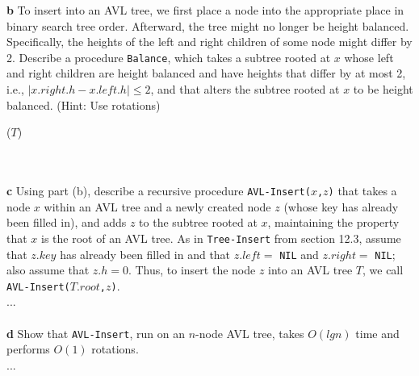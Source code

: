 \documentclass[11pt,english]{article}
\begin{document}
\newpage
\noindent \large{\textbf{b} \mdseries To insert into an AVL tree, we first
place a node into the appropriate place in binary search tree order.
Afterward, the tree might no longer be height balanced. Specifically, the
heights of the left and right children of some node might differ by 2.
Describe a procedure \texttt{Balance}, which takes a subtree rooted at $x$
whose left and right children are height balanced and have heights that differ
by at most 2, i.e., $|x.right.h - x.left.h| \leq 2$, and that alters the
subtree rooted at $x$ to be height balanced. (Hint: Use rotations)}
\\
\begin{algorithm}
	\BlankLine
	
	\Balance($T$) \\
	\Begin
	{
		{
			
		}
	}
\end{algorithm}
\\\\
\noindent \large{\textbf{c} \mdseries Using part (b), describe a recursive
procedure \texttt{AVL-Insert($x$,$z$)} that takes a node $x$ within an AVL
tree and a newly created node $z$ (whose key has already been filled in), and
adds $z$ to the subtree rooted at $x$, maintaining the property that $x$ is
the root of an AVL tree. As in \texttt{Tree-Insert} from section 12.3, assume
that $z.key$ has already been filled in and that $z.left =$ \texttt{NIL} and
$z.right =$ \texttt{NIL}; also assume that $z.h = 0$. Thus, to insert the node
$z$ into an AVL tree $T$, we call \texttt{AVL-Insert($T.root$,$z$)}.}
\\
...
\\\\
\noindent \large{\textbf{d} \mdseries Show that \texttt{AVL-Insert}, run on an
$n$-node AVL tree, takes $O(lg n)$ time and performs $O(1)$ rotations.}
\\
...








\end{document}
